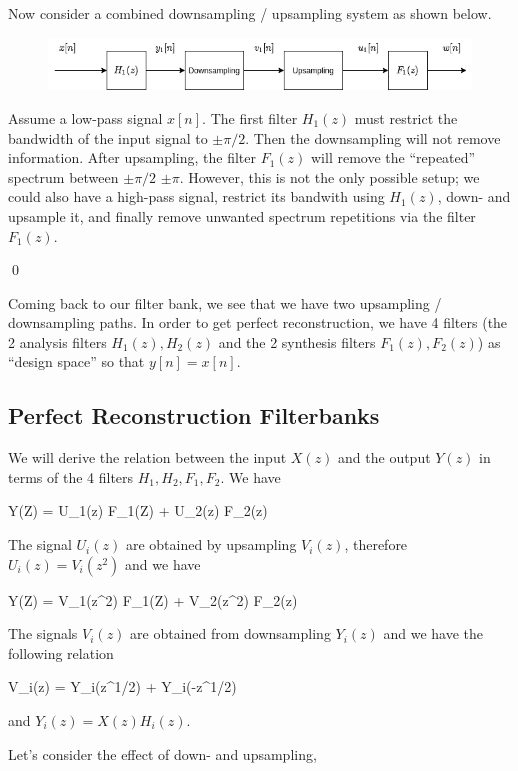 Now consider a combined downsampling / upsampling system as shown below.


\begin{figure}[H]
    \centering
    \includegraphics[scale=0.5]{images/2021-11-09-subband_07.png}
\end{figure}


Assume a low-pass signal $x[n]$. The first filter $H_1(z)$ must restrict the bandwidth of the input signal to $\pm \pi/2$. Then the downsampling will not remove information. After upsampling, the filter $F_1(z)$ will remove the ``repeated'' spectrum between $\pm \pi/2$ $\pm \pi$. However, this is not the only possible setup; we could also have a high-pass signal, restrict its bandwith using $H_1(z)$, down- and upsample it, and finally remove unwanted spectrum repetitions via the filter $F_1(z)$.

\qed


Coming back to our filter bank, we see that we have two upsampling / downsampling paths. In order to get perfect reconstruction, we have 4 filters (the 2 analysis filters $H_1(z), H_2(z)$ and the 2 synthesis filters $F_1(z), F_2(z)$) as ``design space'' so that $y[n] = x[n]$.


\subsection*{Perfect Reconstruction Filterbanks}

We will derive the relation between the input $X(z)$ and the output $Y(z)$ in terms of the 4 filters $H_1, H_2, F_1, F_2$. We have

\bee
Y(Z) = U_1(z) F_1(Z) + U_2(z) F_2(z)
\eee

The signal $U_i(z)$ are obtained by upsampling $V_i(z)$, therefore $U_i(z) = V_i(z^2)$ and we have

\bee
Y(Z) = V_1(z^2) F_1(Z) + V_2(z^2) F_2(z)
\eee

The signals $V_i(z)$ are obtained from downsampling $Y_i(z)$ and we have the following relation

\bee
V_i(z) =  Y_i(z^{1/2}) +  Y_i(-z^{1/2})
\eee

and $Y_i(z) = X(z) H_i(z)$.

Let's consider the effect of down- and upsampling,

